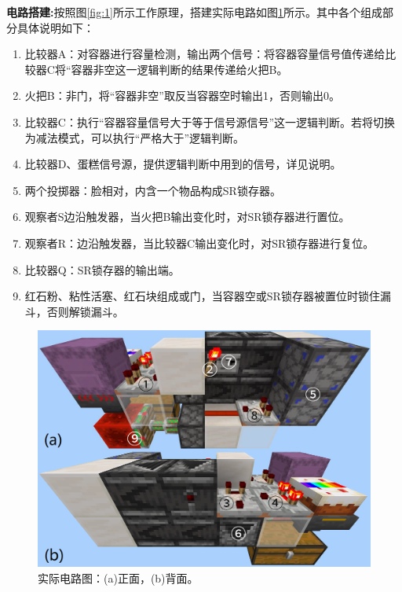 \documentclass[UTF8,12pt,punct=kaiming,fontset=none]{ctexart}
\begin{document}
{\bfseries 电路搭建:}按照图\ref{fig:1}所示工作原理，搭建实际电路如图\ref{fig:2}所示。其中各个组成部分具体说明如下：
\begin{enumerate}
    \item 比较器A：对容器进行容量检测，输出两个信号：将容器容量信号值传递给比较器C将“容器非空这一逻辑判断的结果传递给火把B。
    \item 火把B：非门，将“容器非空”取反当容器空时输出1，否则输出0。
    \item 比较器C：执行“容器容量信号大于等于信号源信号”这一逻辑判断。若将切换为减法模式，可以执行“严格大于”逻辑判断。
    \item 比较器D、蛋糕信号源，提供逻辑判断中用到的信号，详见说明。
    \item 两个投掷器：脸相对，内含一个物品构成SR锁存器。
    \item 观察者S边沿触发器，当火把B输出变化时，对SR锁存器进行置位。
    \item 观察者R：边沿触发器，当比较器C输出变化时，对SR锁存器进行复位。
    \item 比较器Q：SR锁存器的输出端。
    \item 红石粉、粘性活塞、红石块组成或门，当容器空或SR锁存器被置位时锁住漏斗，否则解锁漏斗。
\end{enumerate}

\begin{figure}[h]
    \centering
    \includegraphics[width=.7\textwidth]{图2.png}
    \caption{实际电路图：(a)正面，(b)背面。}
    \label{fig:2}
\end{figure}
\end{document}
